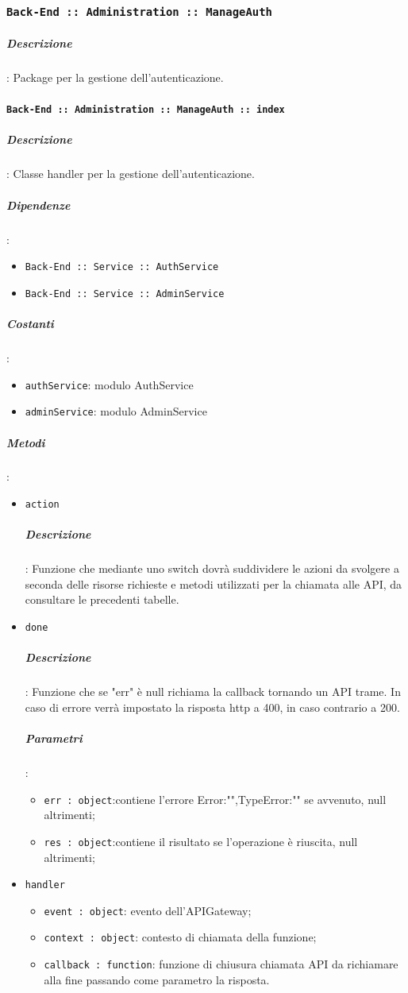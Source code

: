 \documentclass[../DefinizioneDiProdotto_v2.0.0.tex]{subfiles}
\begin{document}
\subsubsection{\texttt{Back-End :: Administration :: ManageAuth}}
\subparagraph{Descrizione}: Package per la gestione dell'autenticazione.

\paragraph{\texttt{Back-End :: Administration :: ManageAuth :: index}}
\subparagraph{Descrizione}: Classe handler per la gestione dell'autenticazione.
\subparagraph{Dipendenze}:
\begin{itemize}
	\item \texttt{Back-End :: Service :: AuthService}
	\item	\texttt{Back-End :: Service :: AdminService}
\end{itemize}
\subparagraph{Costanti}:
\begin{itemize}
	\item \texttt{authService}: modulo AuthService
	\item \texttt{adminService}: modulo AdminService
\end{itemize}
\subparagraph{Metodi}:
\begin{itemize}
	\item \texttt{action}
	      \subparagraph{Descrizione}: Funzione che mediante uno switch dovrà suddividere le azioni da svolgere a seconda delle risorse richieste e metodi utilizzati per la chiamata alle API, da consultare le precedenti tabelle.
	\item \texttt{done}
	      \subparagraph{Descrizione}: Funzione che se "err" è null richiama la callback tornando un API trame. In caso di errore verrà impostato la risposta http a 400, in caso contrario a 200.
	      \subparagraph{Parametri}:
	      \begin{itemize}
	      	\item \texttt{err : object}:contiene l'errore {Error:"",TypeError:""} se avvenuto, null altrimenti;
	      	\item \texttt{res : object}:contiene il risultato se l'operazione è riuscita, null altrimenti;
	      \end{itemize}
	\item \texttt{handler}
	      \begin{itemize}
	      	\item \texttt{event : object}: evento dell'APIGateway;
	      	\item \texttt{context : object}: contesto di chiamata della funzione;
	      	\item \texttt{callback : function}: funzione di chiusura chiamata API da richiamare alla fine passando come parametro la risposta.
	      \end{itemize}
\end{itemize}
\end{document}
